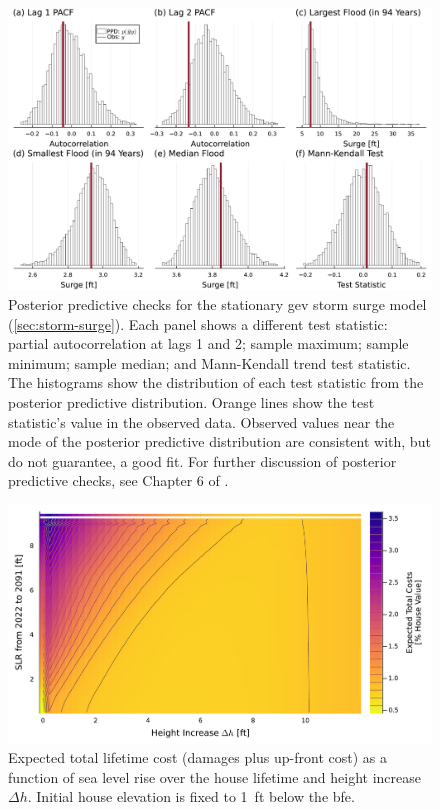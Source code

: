 \documentclass[12pt]{article}
\begin{document}
\begin{figure}
    \centering
    \includegraphics[width=\textwidth]{surge-test-statistics}
    \caption{
        Posterior predictive checks for the stationary \gls{gev} storm surge model (\cref{sec:storm-surge}).
        Each panel shows a different test statistic: partial autocorrelation at lags 1 and 2; sample maximum; sample minimum; sample median; and Mann-Kendall trend test statistic.
        The histograms show the distribution of each test statistic from the posterior predictive distribution.
        Orange lines show the test statistic's value in the observed data.
        Observed values near the mode of the posterior predictive distribution are consistent with, but do not guarantee, a good fit.
        For further discussion of posterior predictive checks, see Chapter 6 of \citet{Gelman:2014tc}.
    }\label{fig:surge-test-statistics}
\end{figure}

\begin{figure}
    \includegraphics[width=\textwidth]{scenario-map-height-slr}
    \caption{
        Expected total lifetime cost (damages plus up-front cost) as a function of sea level rise over the house lifetime and height increase $\Delta h$.
        Initial house elevation is fixed to \SI{1}{ft} below the \gls{bfe}.
    }\label{fig:scenario-map-height-slr}
\end{figure}
\end{document}

